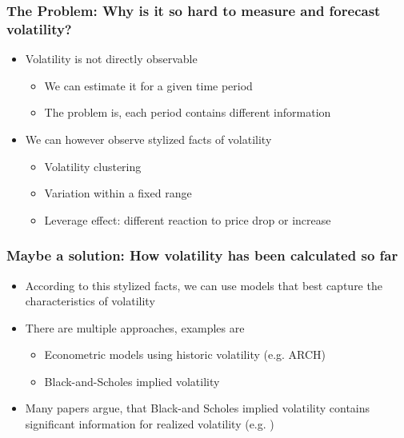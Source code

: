 \documentclass[aspectratio=169]{beamer}
\begin{document}
\begin{frame}
\frametitle{The Problem: Why is it so hard to measure and forecast volatility?}
	\begin{itemize}
	\item<1-> Volatility is not directly observable
		\begin{itemize}
		\item<1-> We can estimate it for a given time period 
		\item<1-> The problem is, each period contains different information
		\end{itemize}
	\item<2-> We can however observe stylized facts of volatility
		\begin{itemize}
		\item<2-> Volatility clustering 
		\item<2-> Variation within a fixed range
		\item<2-> Leverage effect: different reaction to price drop or increase
		\end{itemize}
	\end{itemize}
\end{frame}

\begin{frame}
\frametitle{Maybe a solution: How volatility has been calculated so far}
	\begin{itemize}
	\item<1-> According to this stylized facts, we can use models that best capture the characteristics of volatility
	\item<2-> There are multiple approaches, examples are
		\begin{itemize}
		\item<2-> Econometric models using historic volatility (e.g. ARCH)
		\item<2-> Black-and-Scholes implied volatility
		\end{itemize}
	\item<3-> Many papers argue, that Black-and Scholes implied volatility contains significant information for realized volatility (e.g. \textcite{jiang2005})
	\end{itemize}
\end{frame}
\end{document}
